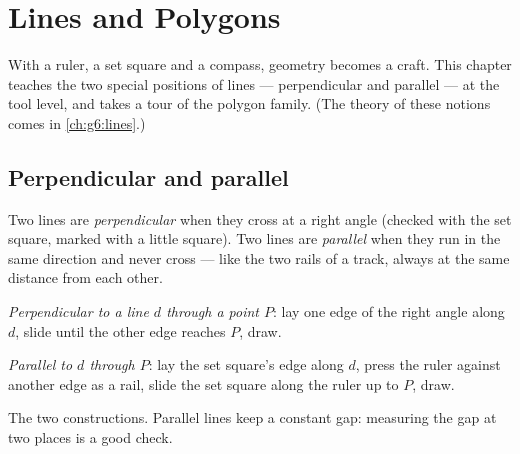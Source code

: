 \chapter{Lines and Polygons}\label{ch:g4:geometry}

With a ruler, a set square and a compass, geometry becomes a craft.
This chapter teaches the two special positions of lines ---
perpendicular and parallel --- at the tool level, and takes a tour of
the polygon family. (The theory of these notions comes in
\cref{ch:g6:lines}.)

\section{Perpendicular and parallel}

\begin{definition}\label{def:g4:geometry:def}
Two lines are \emph{perpendicular} when
they cross at a right angle (checked with the set square, marked with
a little square). Two lines are \emph{parallel}
when they run in the same direction and never cross --- like the two
rails of a track, always at the same distance from each other.
\end{definition}

\begin{method}\label{met:g4:geometry:draw}
\emph{Perpendicular to a line $d$ through a point $P$}: lay one edge
of the right angle along $d$, slide until the other edge reaches $P$,
draw.

\emph{Parallel to $d$ through $P$}: lay the set square's edge along
$d$, press the ruler against another edge as a rail, slide the set
square along the ruler up to $P$, draw.
\end{method}

\begin{omfigure}

{\small The two constructions. Parallel lines keep a constant gap:
measuring the gap at two places is a good check.}
\end{omfigure}


